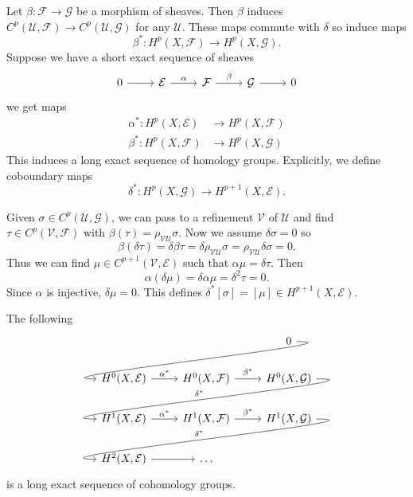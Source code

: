 \documentclass[a4paper]{article}
\begin{document}
Let \(\beta: \mathcal F \to \mathcal G\) be a morphism of sheaves. Then \(\beta\) induces \(C^p(\mathcal U, \mathcal F) \to C^p(\mathcal U, \mathcal G)\) for any \(\mathcal U\). These maps commute with \(\delta\) so induce maps
\[
  \beta^*: H^p(X, \mathcal F) \to H^p(X, \mathcal G).
\]
Suppose we have a short exact sequence of sheaves
\[
  \begin{tikzcd}
    0 \ar[r] & \mathcal E \ar[r, "\alpha"] & \mathcal F \ar[r, "\beta"] & \mathcal G \ar[r] & 0
  \end{tikzcd}
\]
we get maps
\begin{align*}
  \alpha^*: H^p(X, \mathcal E) &\to H^p(X, \mathcal F) \\
  \beta^*: H^p(X, \mathcal F) &\to H^p(X, \mathcal G)
\end{align*}
This induces a long exact sequence of homology groups. Explicitly, we define coboundary maps
\[
  \delta^*: H^p(X, \mathcal G) \to H^{p + 1}(X, \mathcal E).
\]

Given \(\sigma \in C^p(\mathcal U, \mathcal G)\), we can pass to a refinement \(\mathcal V\) of \(\mathcal U\) and find \(\tau \in C^p(\mathcal V, \mathcal F)\) with \(\beta(\tau) = \rho_{\mathcal V \mathcal U} \sigma\). Now we assume \(\delta \sigma = 0\) so
\[
  \beta(\delta \tau)
  = \delta \beta \tau
  = \delta \rho_{\mathcal V \mathcal U} \sigma
  = \rho_{\mathcal V \mathcal U} \delta \sigma
  = 0.
\]
Thus we can find \(\mu \in C^{p + 1}(\mathcal V, \mathcal E)\) such that \(\alpha \mu = \delta \tau\). Then
\[
  \alpha(\delta \mu) = \delta \alpha \mu = \delta^2 \tau = 0.
\]
Since \(\alpha\) is injective, \(\delta \mu = 0\). This defines \(\delta^*[\sigma] = [\mu] \in H^{p + 1}(X, \mathcal E)\).

\begin{theorem}
  The following
  \[
    \begin{tikzcd}
      & & 0 \ar[dll, out=0, in=180] \\
      H^0(X, \mathcal E) \ar[r, "\alpha^*"] & H^0(X, \mathcal F) \ar[r, "\beta^*"] & H^0(X, \mathcal G) \ar[dll, "\delta^*"', out=0, in=180] \\
      H^1(X, \mathcal E) \ar[r, "\alpha^*"] & H^1(X, \mathcal F) \ar[r, "\beta^*"] & H^1(X, \mathcal G) \ar[dll, "\delta^*"', out=0, in=180] \\
      H^2(X, \mathcal E) \ar[r] & \dots
    \end{tikzcd}
  \]
  is a long exact sequence of cohomology groups.
\end{theorem}
\end{document}
